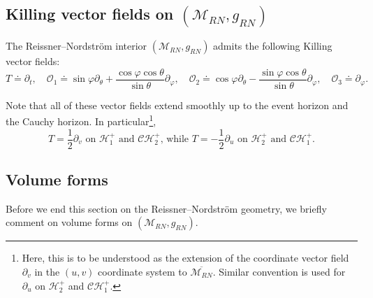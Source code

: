 \documentclass[10pt, reqno]{amsart}
\theoremstyle{definition}
\theoremstyle{remark}
\numberwithin{equation}{section}
\newcommand{\rd}{\partial}
\newcommand{\0}{\emptyset}
\newcommand{\calC}{\mathcal C}
\newcommand{\calH}{\mathcal H}
\newcommand{\f}{\frac}
\newcommand{\CH}{\calC \calH^{+}}		%
\newcommand{\EH}{\calH^{+}}
\begin{document}
\subsection{Killing vector fields on $(\mathcal M_{RN},g_{RN})$}\label{sec:vectorfields}

The Reissner--Nordstr\"om interior $(\mathcal M_{RN}, g_{RN})$ admits the following Killing vector fields:
\begin{equation}\label{eq:def.Killing}
T \doteq \rd_t,\quad \mathcal O_1 \doteq \sin\varphi \rd_{\theta} + \f{\cos\varphi\cos\theta}{\sin\theta}\rd_{\varphi},\quad \mathcal O_2 \doteq \cos\varphi\rd_{\theta}-\f{\sin\varphi\cos\theta}{\sin\theta}\rd_{\varphi},\quad \mathcal O_3 \doteq \rd_{\varphi}.
\end{equation}

Note that all of these vector fields extend smoothly up to the event horizon and the Cauchy horizon. In particular\footnote{Here, this is to be understood as the extension of the coordinate vector field $\rd_v$ in the $(u,v)$ coordinate system to $\overline{\mathcal M_{RN}}$. Similar convention is used for $\rd_u$ on $\EH_2$ and $\CH_1$.}, 
\begin{equation}\label{T.on.the.horizons}
\mbox{$T = \f 12\rd_v$ on\ $\EH_1$ and $\CH_2$, while $T = - \f 12\rd_u$ on $\EH_2$ and $\CH_1$.}
\end{equation}

\subsection{Volume forms}\label{sec:vol}

Before we end this section on the Reissner--Nordstr\"om geometry, we briefly comment on volume forms on $(\mathcal M_{RN},g_{RN})$.
\end{document}

